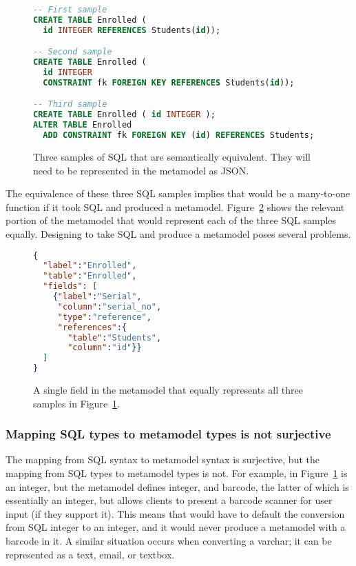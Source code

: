 \begin{figure}[h!]
\begin{lstlisting}[language=sql]
-- First sample
CREATE TABLE Enrolled (
  id INTEGER REFERENCES Students(id));

-- Second sample
CREATE TABLE Enrolled (
  id INTEGER
  CONSTRAINT fk FOREIGN KEY REFERENCES Students(id));

-- Third sample
CREATE TABLE Enrolled ( id INTEGER );
ALTER TABLE Enrolled
  ADD CONSTRAINT fk FOREIGN KEY (id) REFERENCES Students;
\end{lstlisting}
\caption{Three samples of SQL that are semantically equivalent. They will need
to be represented in the metamodel as JSON.}
\label{fig:metamodel_sql}
\end{figure}

The equivalence of these three SQL samples implies that  would be a
many-to-one function if it took SQL and produced a metamodel.
Figure~\ref{fig:metamodel_json_convert1} shows the relevant portion of the
metamodel that would represent each of the three SQL samples equally.
Designing  to take SQL and produce a metamodel poses several problems.

\begin{figure}[h!]
\begin{lstlisting}[language=json]
{
  "label":"Enrolled",
  "table":"Enrolled",
  "fields": [
    {"label":"Serial",
     "column":"serial_no",
     "type":"reference",
     "references":{
       "table":"Students",
       "column":"id"}}
  ]
}
\end{lstlisting}
\caption{A single field in the metamodel that equally represents all three
samples in Figure~\ref{fig:metamodel_sql}.}
\label{fig:metamodel_json_convert1}
\end{figure}


\subsubsection{Mapping SQL types to metamodel types is not surjective}
\label{sec:metamodel_issue1}

The mapping from SQL syntax to metamodel syntax is surjective, but the
mapping from SQL types to metamodel types is not. For example,  in
Figure~\ref{fig:metamodel_sql} is an integer, but the metamodel defines
integer, and barcode, the latter of which is essentially an
integer, but allows clients to present a barcode scanner for user input (if
they support it). This means that  would have to default the conversion
from SQL integer to an integer, and it would never produce a metamodel with
a barcode in it. A similar situation occurs when converting a
varchar; it can be represented as a text, email, or textbox.


